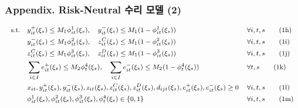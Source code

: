 \documentclass[xcolor=dvipsnames,t,9pt]{beamer}
\begin{document}
{
\begin{frame}[noframenumbering]
    \frametitle{Appendix. Risk-Neutral 수리 모델 (2)}
    \vspace{-1em}
    \begin{block}{}
        \vspace{-0.7em}
        \begin{subequations}
            \footnotesize
            \begin{flalign}
                \text{s.t.} \quad
                 & y^+_{it}(\xi_s) \le M_1 \phi^1_{it}(\xi_s), \quad
                y^-_{it}(\xi_s) \le M_1 (1 - \phi^1_{it}(\xi_s))
                 &                                                                 & \forall i, t, s \tag{1h} \\
                 & y^-_{it}(\xi_s) \le M_1 \phi^2_{it}(\xi_s), \quad
                z^C_{it}(\xi_s) \le M_1 (1 - \phi^2_{it}(\xi_s))
                 &                                                                 & \forall i, t, s \tag{1i} \\
                 & z^C_{it}(\xi_s) \le M_1 \phi^3_{it}(\xi_s), \quad
                z^D_{it}(\xi_s) \le M_1 (1 - \phi^3_{it}(\xi_s))
                 &                                                                 & \forall i, t, s \tag{1j} \\
                 & \sum_{i \in I} e^+_{it}(\xi_s) \le M_2 \phi^4_{t}(\xi_s), \quad
                \sum_{i \in I} e^-_{it}(\xi_s) \le M_2 (1 - \phi^4_{t}(\xi_s))
                 &                                                                 & \forall t, s \tag{1k}    \\
                 & x_{it}, y^+_{it}(\xi_s), y^-_{it}(\xi_s), z_{it}(\xi_s),
                z^C_{it}(\xi_s), z^D_{it}(\xi_s), d_{ijt}(\xi_s), e^+_{it}(\xi_s),
                e^-_{it}(\xi_s) \ge 0
                 &                                                                 & \forall i, t, s \tag{1l} \\
                 & \phi^1_{it}(\xi_s), \phi^2_{it}(\xi_s), \phi^3_{it}(\xi_s),
                \phi^4_{t}(\xi_s) \in \{0, 1\}
                 &                                                                 & \forall i, t, s \tag{1m}
            \end{flalign}
        \end{subequations}
    \end{block}

\end{frame}}
\end{document}

